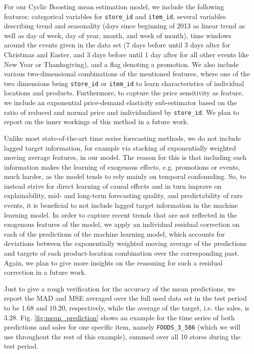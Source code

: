 \documentclass[BCOR=1mm, DIV=calc,10pt,
twoside=true,
twocolumn,
headings=normal]{scrartcl}
\newcommand{\fig}{Fig. }
\begin{document}
For our Cyclic Boosting mean estimation model, we include the following features: categorical variables for \texttt{store\_id} and \texttt{item\_id}, several variables describing trend and seasonality (days since beginning of 2013 as linear trend as well as day of week, day of year, month, and week of month), time windows around the events given in the data set (7 days before until 3 days after for Christmas and Easter, and 3 days before until 1 day after for all other events like New Year or Thanksgiving), and a flag denoting a promotion. We also include various two-dimensional combinations of the mentioned features, where one of the two dimensions being \texttt{store\_id} or \texttt{item\_id} to learn characteristics of individual locations and products. Furthermore, to capture the price sensitivity as feature, we include an exponential price-demand elasticity sub-estimator based on the ratio of reduced and normal price and individualized by \texttt{store\_id}. We plan to report on the inner workings of this method in a future work.

Unlike most state-of-the-art time series forecasting methods, we do not include lagged target information, for example via stacking of exponentially weighted moving average features, in our model. The reason for this is that including such information makes the learning of exogenous effects, e.g. promotions or events, much harder, as the model tends to rely mainly on temporal confounding. So, to instead strive for direct learning of causal effects and in turn improve on explainability, mid- and long-term forecasting quality, and predictability of rare events, it is beneficial to not include lagged target information in the machine learning model. In order to capture recent trends that are not reflected in the exogenous features of the model, we apply an individual residual correction on each of the predictions of the machine learning model, which accounts for deviations between the exponentially weighted moving average of the predictions and targets of each product-location combination over the corresponding past. Again, we plan to give more insights on the reasoning for such a residual correction in a future work.

Just to give a rough verification for the accuracy of the mean predictions, we report the MAD and MSE averaged over the full used data set in the test period to be $1.68$ and $10.20$, respectively, while the average of the target, i.e. the sales, is $3.28$. \fig \ref{fig:mean_prediction} shows an example for the time series of both predictions and sales for one specific item, namely \texttt{FOODS\_3\_586} (which we will use throughout the rest of this example), summed over all 10 stores during the test period.
\end{document}
